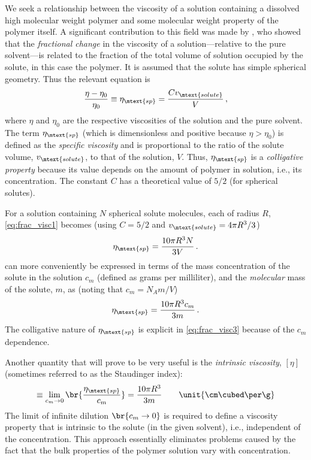 We seek a relationship between the viscosity of a solution containing a dissolved high molecular weight polymer and some molecular weight property of the polymer itself. 
A significant contribution to this field was made by \textcite{einstein06}, who showed that the \emph{fractional change} in the viscosity of a solution---relative to the pure solvent---is related to the fraction of the total volume of solution occupied by the solute, in this case the polymer. 
It is assumed that the solute has simple spherical geometry. 
Thus the relevant equation is
\begin{equation}
	\frac{\eta - \eta_0}{\eta_0} \equiv \eta_\mtext{sp} = \frac{C v_\mtext{solute}}{V} \, ,
	\label{eq:frac_visc1}
\end{equation}
where \( \eta \) and \( \eta_0 \) are the respective viscosities of the solution and the pure solvent. 
The term \( \eta_\mtext{sp} \) (which is dimensionless and positive because \( \eta > \eta_0 \)) is defined as the \emph{specific viscosity} and is proportional to the ratio of the solute volume, \( v_\mtext{solute} \), to that of the solution, \( V \). 
Thus, \( \eta_\mtext{sp} \) is a \emph{colligative property} because its value depends on the amount of polymer in solution, i.e., its concentration. 
The constant \( C \) has a theoretical value of \( 5/2 \) (for spherical solutes). 

For a solution containing \( N \) spherical solute molecules, each of radius \( R \), \cref{eq:frac_visc1} becomes (using \( C = 5/2 \) and \( v_\mtext{solute} = 4 \pi R^3 / 3 \))
\begin{equation}
	\eta_\mtext{sp} = \frac{10 \pi R^3 N}{3 V} \, .
	\label{eq:frac_visc2}
\end{equation}
 can more conveniently be expressed in terms of the mass concentration of the solute in the solution \( c_m \) (defined as grams per milliliter), and the \emph{molecular} mass of the solute, \( m \), as (noting that \( c_m = N_A m / V \))
\begin{equation}
	\eta_\mtext{sp} = \frac{10 \pi R^3 c_m}{3 m} \, .
	\label{eq:frac_visc3}
\end{equation}
The colligative nature of \( \eta_\mtext{sp} \) is explicit in \cref{eq:frac_visc3} because of the \( c_m \) dependence. 

Another quantity that will prove to be very useful is the \emph{intrinsic viscosity}, \( [\eta] \) (sometimes referred to as the Staudinger index):
\begin{equation}
	[\eta] \equiv \lim_{c_m \to 0}\br{\frac{\eta_\mtext{sp}}{c_m}} = \frac{10\pi R^3}{3 m} \qquad \unit{\cm\cubed \per \g}
	\label{eq:staud_ind1}
\end{equation}
The limit of infinite dilution \( \br{ c_m \to 0} \) is required to define a viscosity property that is intrinsic to the solute (in the given solvent), i.e., independent of the concentration. 
This approach essentially eliminates problems caused by the fact that the bulk properties of the polymer solution vary with concentration. 

